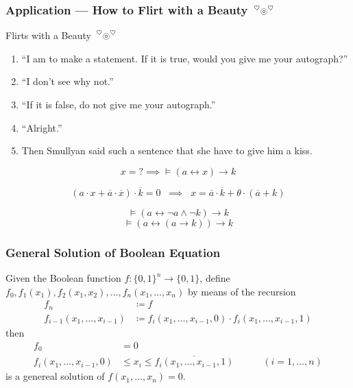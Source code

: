 \documentclass[UTF8,11pt,colorlinks,compress,openany]{beamer}%
\begin{document}
\begin{frame}\frametitle{Application --- How to Flirt with a Beauty $\sideset{^\heartsuit}{^\heartsuit}{\operatorname{\circledcirc}}$}
	\begin{block}{\hyperlink{smullyan-curry}{}\label{smullyan-boole} Flirts with a Beauty $\sideset{^\heartsuit}{^\heartsuit}{\operatorname{\circledcirc}}$}
	\begin{enumerate}\small
		\item ``I am to make a statement. If it is true, would you give me your autograph?''
		\item ``I don't see why not.''
		\item ``If it is false, do not give me your autograph.''
		\item ``Alright.''
		\item Then Smullyan said such a sentence that she have to give him a kiss.
	\end{enumerate}
	\end{block}
\[x=?\implies\vDash(a\leftrightarrow x)\to k\]
	\pause
	\begin{solution}\vspace*{-1ex}
		\[\left(a\cdot x+\overline{a}\cdot\overline{x}\right)\cdot\overline{k}=0\;\;\implies \;\; x=\overline{a}\cdot\overline{k}+\theta\cdot(\overline{a}+k)\]
	\end{solution}\vspace{-2ex}
	\[\vDash(a\leftrightarrow\neg a\wedge\neg k)\to k\]
	\[\vDash(a\leftrightarrow(a\to k))\to k\]
\end{frame}

\begin{frame}\frametitle{General Solution of Boolean Equation}
	\begin{theorem}
		Given the Boolean function $f:\{0,1\}^n\to\{0,1\}$, define $f_0, f_1(x_1), f_2(x_1,x_2),\dots, f_n(x_1,\dots,x_n)$ by means of the recursion
		\begin{align*}
		f_n&\coloneqq f\\
		f_{i-1}(x_1,\dots,x_{i-1})&\coloneqq f_i(x_1,\dots,x_{i-1},0)\cdot f_i(x_1,\dots,x_{i-1},1)
		\end{align*}
		then
		\begin{align*}
		f_0&=0\\
		f_i(x_1,\dots,x_{i-1},0)&\leq x_i\leq\overline{f_i(x_1,\dots,x_{i-1},1)}\qquad\quad (i=1,\dots,n)
		\end{align*}
		is a genereal solution of $f(x_1,\dots,x_n)=0$.
	\end{theorem}
\end{frame}
\end{document}
